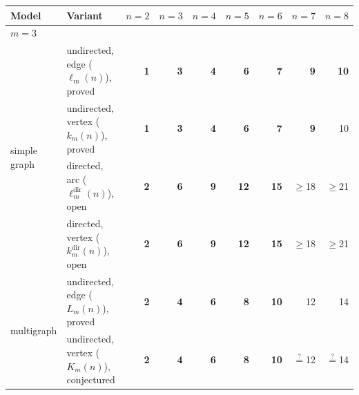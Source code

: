 \begin{tabular}{llrrrrrrr}
\toprule
Model & Variant & $n=2$ & $n=3$ & $n=4$ & $n=5$ & $n=6$ & $n=7$ & $n=8$ \\
\midrule
\multicolumn{9}{l}{\textbf{$m=3$}} \\
\midrule
\multirow{4}{*}{simple graph} & undirected, edge ($\ell_m(n)$), \textcolor{vtProved}{proved} & \textcolor{vtExact}{\textbf{1}} & \textcolor{vtExact}{\textbf{3}} & \textcolor{vtExact}{\textbf{4}} & \textcolor{vtExact}{\textbf{6}} & \textcolor{vtExact}{\textbf{7}} & \textcolor{vtExact}{\textbf{9}} & \textcolor{vtExact}{\textbf{10}} \\
 & undirected, vertex ($k_m(n)$), \textcolor{vtProved}{proved} & \textcolor{vtExact}{\textbf{1}} & \textcolor{vtExact}{\textbf{3}} & \textcolor{vtExact}{\textbf{4}} & \textcolor{vtExact}{\textbf{6}} & \textcolor{vtExact}{\textbf{7}} & \textcolor{vtExact}{\textbf{9}} & \textcolor{vtProved}{10} \\
 & directed, arc ($\ell_m^{\mathrm{dir}}(n)$), \textcolor{vtOpen}{open} & \textcolor{vtExact}{\textbf{2}} & \textcolor{vtExact}{\textbf{6}} & \textcolor{vtExact}{\textbf{9}} & \textcolor{vtExact}{\textbf{12}} & \textcolor{vtExact}{\textbf{15}} & \textcolor{vtOpen}{$\ge$18} & \textcolor{vtOpen}{$\ge$21} \\
 & directed, vertex ($k_m^{\mathrm{dir}}(n)$), \textcolor{vtOpen}{open} & \textcolor{vtExact}{\textbf{2}} & \textcolor{vtExact}{\textbf{6}} & \textcolor{vtExact}{\textbf{9}} & \textcolor{vtExact}{\textbf{12}} & \textcolor{vtExact}{\textbf{15}} & \textcolor{vtOpen}{$\ge$18} & \textcolor{vtOpen}{$\ge$21} \\
\midrule
\multirow{4}{*}{multigraph} & undirected, edge ($L_m(n)$), \textcolor{vtProved}{proved} & \textcolor{vtExact}{\textbf{2}} & \textcolor{vtExact}{\textbf{4}} & \textcolor{vtExact}{\textbf{6}} & \textcolor{vtExact}{\textbf{8}} & \textcolor{vtExact}{\textbf{10}} & \textcolor{vtProved}{12} & \textcolor{vtProved}{14} \\
 & undirected, vertex ($K_m(n)$), \textcolor{vtConjectured}{conjectured} & \textcolor{vtExact}{\textbf{2}} & \textcolor{vtExact}{\textbf{4}} & \textcolor{vtExact}{\textbf{6}} & \textcolor{vtExact}{\textbf{8}} & \textcolor{vtExact}{\textbf{10}} & \textcolor{vtConjectured}{$\stackrel{?}{=}$12} & \textcolor{vtConjectured}{$\stackrel{?}{=}$14} \\

\end{tabular}
